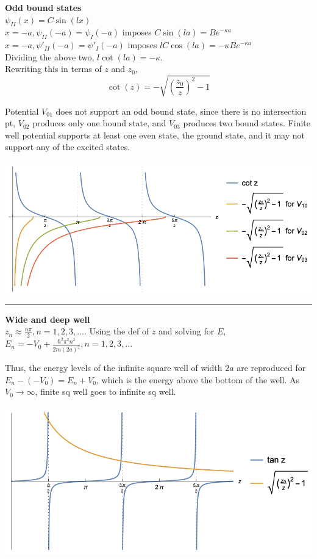 \textbf{Odd bound states} \\
$\psi_{II}(x) = C \sin(lx)$ \\

$x = -a, \psi_{II}(-a) = \psi_{I}(-a)$ imposes $C \sin(la) = B e^{-\kappa a}$ \\
$x = -a, \psi'_{II}(-a) = \psi'_{I}(-a)$ imposes $l C \cos(la) = -\kappa B e^{-\kappa a}$ \\

Dividing the above two, $l \cot(la) = -\kappa$. \\
Rewriting this in terms of $z$ and $z_0$, $$\cot(z) = - \sqrt{(\frac{z_0}{z})^2 - 1}$$

Potential $V_{01}$ does not support an odd bound state, since there is no intersection pt, $V_{02}$ produces only one bound state, and $V_{03}$ produces two bound states. Finite well potential supports at least one even state, the ground state, and it may not support any of the excited states.

\vspace{0em}
\begin{Figure}
    \raggedright
    \includegraphics[width=0.6\columnwidth]{figures/odd_finite_square_well.png}
\end{Figure}
\vspace{0em}


\medskip
\hrule height 0.3pt \thinspace

\textbf{Wide and deep well} \\
$z_n \approx \frac{n \pi}{2}, n = 1, 2, 3, ...$. Using the def of $z$ and solving for $E$, $E_n = -V_0 + \frac{\hbar^2 \pi^2 n^2}{2m(2a)^2}, n = 1, 2, 3, ...$

Thus, the energy levels of the infinite square well of width $2a$ are reproduced for $E_n - (-V_0) = E_n + V_0$, which is the energy above the bottom of the well. As $V_0 \rightarrow \infty$, finite sq well goes to infinite sq well.

\vspace{0em}
\begin{Figure}
    \raggedright
    \includegraphics[width=0.6\columnwidth]{figures/wide_deep_finite_square_well.png}
\end{Figure}
\vspace{0em}

